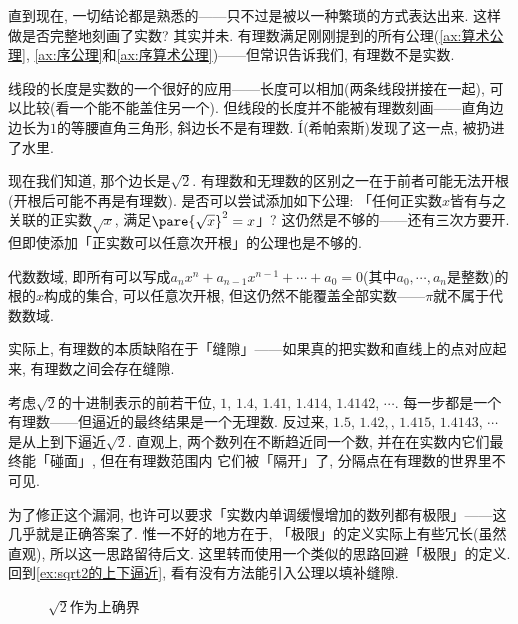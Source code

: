 \documentclass[hidelinks]{ctexart}
\begin{document}
直到现在, 一切结论都是熟悉的——只不过是被以一种繁琐的方式表达出来. 这样做是否完整地刻画了实数? 其实并未. 有理数满足刚刚提到的所有公理(\cref{ax:算术公理}, \cref{ax:序公理}和\cref{ax:序算术公理})——但常识告诉我们, 有理数不是实数.
\begin{sample}
    \begin{ex}
        线段的长度是实数的一个很好的应用——长度可以相加(两条线段拼接在一起), 可以比较(看一个能不能盖住另一个). 但线段的长度并不能被有理数刻画——直角边边长为$1$的等腰直角三角形, 斜边长不是有理数. \'{I}\textpi\textpi\textalpha\textsigma\textomikron\textvarsigma (希帕索斯)发现了这一点, 被扔进了水里.
    \end{ex}
\end{sample}
现在我们知道, 那个边长是$\sqrt{2}$. 有理数和无理数的区别之一在于前者可能无法开根(开根后可能不再是有理数). 是否可以尝试添加如下公理: 「任何正实数$x$皆有与之关联的正实数$\sqrt{x}$, 满足$\pare{\sqrt{x}}^2 = x$」? 这仍然是不够的——还有三次方要开. 但即使添加「正实数可以任意次开根」的公理也是不够的.
\begin{sample}
    \begin{ex}
        代数数域, 即所有可以写成$a_n x^n + a_{n-1}x^{n-1} + \cdots + a_0 = 0$(其中$a_0, \cdots, a_n$是整数)的根的$x$构成的集合, 可以任意次开根, 但这仍然不能覆盖全部实数——$\pi$就不属于代数数域.
    \end{ex}
\end{sample}
实际上, 有理数的本质缺陷在于「缝隙」——如果真的把实数和直线上的点对应起来, 有理数之间会存在缝隙.
\begin{sample}
    \begin{ex}
        \label{ex:sqrt2的上下逼近}
        考虑$\sqrt{2}$的十进制表示的前若干位, $1$, $1.4$, $1.41$, $1.414$, $1.4142$, $\cdots$. 每一步都是一个有理数——但逼近的最终结果是一个无理数. 反过来, $1.5$, $1.42,$, $1.415$, $1.4143$, $\cdots$是从上到下逼近$\sqrt{2}$. 直观上, 两个数列在不断趋近同一个数, 并在在实数内它们最终能「碰面」, 但在有理数范围内 它们被「隔开」了, 分隔点在有理数的世界里不可见.
    \end{ex}
\end{sample}
为了修正这个漏洞, 也许可以要求「实数内单调缓慢增加的数列都有极限」——这几乎就是正确答案了. 惟一不好的地方在于, 「极限」的定义实际上有些冗长(虽然直观), 所以这一思路留待后文. 这里转而使用一个类似的思路回避「极限」的定义. 回到\cref{ex:sqrt2的上下逼近}, 看有没有方法能引入公理以填补缝隙.

\begin{figure}[h]
    \centering
    \caption{$\sqrt{2}$作为上确界}
    \label{fig:sqrt2作为上确界}
\end{figure}
\end{document}
